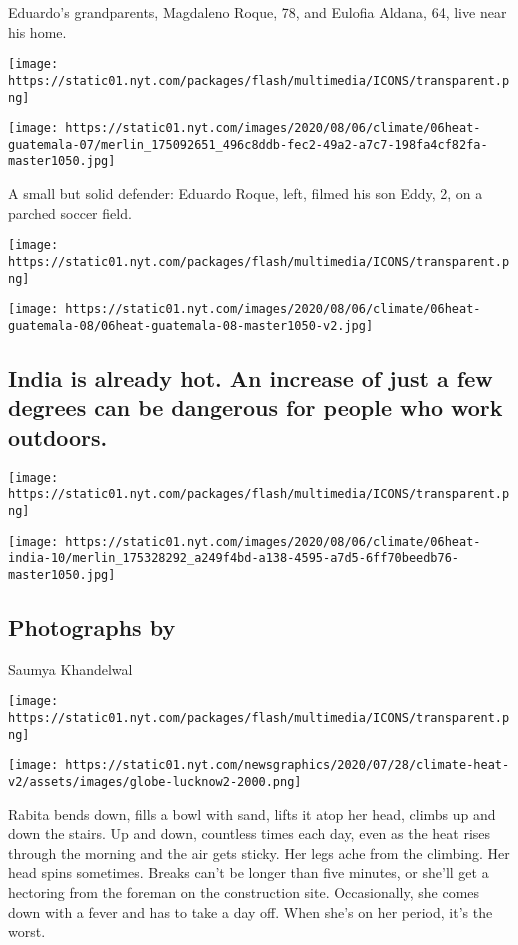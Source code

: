 Eduardo's grandparents, Magdaleno Roque, 78, and Eulofia Aldana, 64,
live near his home.

\texttt{[image: https://static01.nyt.com/packages/flash/multimedia/ICONS/transparent.png]}

\texttt{[image: https://static01.nyt.com/images/2020/08/06/climate/06heat-guatemala-07/merlin\_175092651\_496c8ddb-fec2-49a2-a7c7-198fa4cf82fa-master1050.jpg]}

A small but solid defender: Eduardo Roque, left, filmed his son Eddy, 2,
on a parched soccer field.

\texttt{[image: https://static01.nyt.com/packages/flash/multimedia/ICONS/transparent.png]}

\texttt{[image: https://static01.nyt.com/images/2020/08/06/climate/06heat-guatemala-08/06heat-guatemala-08-master1050-v2.jpg]}

\hypertarget{india-is-already-hot-an-increase-of-just-a-few-degrees-can-be-dangerous-for-people-who-work-outdoors}{%
\subsection{India is already hot. An increase of just a few degrees can
be dangerous for people who work
outdoors.}\label{india-is-already-hot-an-increase-of-just-a-few-degrees-can-be-dangerous-for-people-who-work-outdoors}}

\texttt{[image: https://static01.nyt.com/packages/flash/multimedia/ICONS/transparent.png]}

\texttt{[image: https://static01.nyt.com/images/2020/08/06/climate/06heat-india-10/merlin\_175328292\_a249f4bd-a138-4595-a7d5-6ff70beedb76-master1050.jpg]}

\hypertarget{photographs-by-4}{%
\subsection{Photographs by}\label{photographs-by-4}}

Saumya Khandelwal

\texttt{[image: https://static01.nyt.com/packages/flash/multimedia/ICONS/transparent.png]}

\texttt{[image: https://static01.nyt.com/newsgraphics/2020/07/28/climate-heat-v2/assets/images/globe-lucknow2-2000.png]}

Rabita bends down, fills a bowl with sand, lifts it atop her head,
climbs up and down the stairs. Up and down, countless times each day,
even as the heat rises through the morning and the air gets sticky. Her
legs ache from the climbing. Her head spins sometimes. Breaks can't be
longer than five minutes, or she'll get a hectoring from the foreman on
the construction site. Occasionally, she comes down with a fever and has
to take a day off. When she's on her period, it's the worst.

